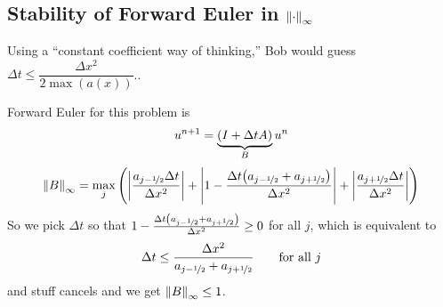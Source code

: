 \documentclass{article}
\newcommand{\half}{\nicefrac{1}{2}}
\newcommand{\Dx}{\Delta x}
\newcommand{\Dt}{\Delta t}
\begin{document}
        \subsection{Stability of Forward Euler in $\norm{\cdot}_\infty$}

            Using a ``constant coefficient way of thinking,'' Bob would guess $\Dt \leq \dfrac{\Dx^2}{2\max(a(x))}$..

            Forward Euler for this problem is
            \begin{align*}
                u^{n+1} = \underbrace{\qty(I + \Dt A)}_Bu^n
            \end{align*}
            \begin{align*}
                \norm{B}_\infty = \max_j\qty(\abs{\frac{a_{j-\half}\Dt}{\Dx^2}} + \abs{1 - \frac{\Dt\qty(a_{j-\half} + a_{j+\half})}{\Dx^2}} + \abs{\frac{a_{j+\half}\Dt}{\Dx^2}})
            \end{align*}
            So we pick $\Dt$ so that $1 - \frac{\Dt\qty(a_{j-\half} + a_{j+\half})}{\Dx^2} \geq 0$ for all $j$, which is equivalent to
            \begin{align*}
                \Dt \leq \frac{\Dx^2}{a_{j-\half} + a_{j+\half}} \qquad \text{for all $j$}
            \end{align*}
            and stuff cancels and we get $\norm{B}_\infty \leq 1$.
\end{document}
